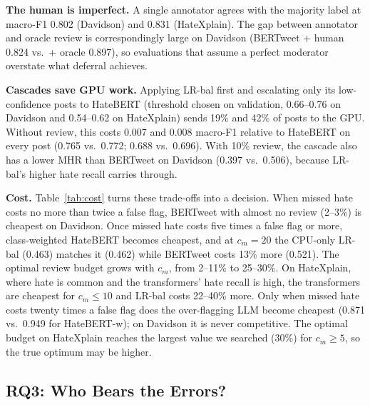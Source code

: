 \documentclass[lettersize,journal]{IEEEtran}
\begin{document}
\textbf{The human is imperfect.} A single annotator agrees with the majority label at macro-F1 0.802 (Davidson) and 0.831 (HateXplain). The gap between annotator and oracle review is correspondingly large on Davidson (BERTweet + human 0.824 vs.\ + oracle 0.897), so evaluations that assume a perfect moderator overstate what deferral achieves.

\textbf{Cascades save GPU work.} Applying LR-bal first and escalating only its low-confidence posts to HateBERT (threshold chosen on validation, 0.66--0.76 on Davidson and 0.54--0.62 on HateXplain) sends 19\% and 42\% of posts to the GPU. Without review, this costs 0.007 and 0.008 macro-F1 relative to HateBERT on every post (0.765 vs.\ 0.772; 0.688 vs.\ 0.696). With 10\% review, the cascade also has a lower MHR than BERTweet on Davidson (0.397 vs.\ 0.506), because LR-bal's higher hate recall carries through.

\begin{table}[t]
\centering
\caption{Cost-Minimizing Review Budget $b^{*}$ and Expected Cost per Post $J(b^{*})$ as the Cost of Missed Hate $c_m$ Grows (Mean Over Splits; Budgets Searched Up to 30\%). Bold: Lowest Cost.}
\label{tab:cost}
\scriptsize
\setlength{\tabcolsep}{4pt}

\end{table}

\textbf{Cost.} Table~\ref{tab:cost} turns these trade-offs into a decision. When missed hate costs no more than twice a false flag, BERTweet with almost no review (2--3\%) is cheapest on Davidson. Once missed hate costs five times a false flag or more, class-weighted HateBERT becomes cheapest, and at $c_m=20$ the CPU-only LR-bal (0.463) matches it (0.462) while BERTweet costs 13\% more (0.521). The optimal review budget grows with $c_m$, from 2--11\% to 25--30\%. On HateXplain, where hate is common and the transformers' hate recall is high, the transformers are cheapest for $c_m\le10$ and LR-bal costs 22--40\% more. Only when missed hate costs twenty times a false flag does the over-flagging LLM become cheapest (0.871 vs.\ 0.949 for HateBERT-w); on Davidson it is never competitive. The optimal budget on HateXplain reaches the largest value we searched (30\%) for $c_m\ge5$, so the true optimum may be higher.

\subsection{RQ3: Who Bears the Errors?}\label{sec:rq3}
\begin{table}[t]
\centering
\caption{Dialect Disparity on Davidson (Posterior Threshold 0.5; Mean Over Splits). FHF = False Hate-Flag Rate Among Non-Hate Tweets; FAF = False Abusive-Flag Rate (Hate or Offensive) Among Tweets Labeled Neither; Deferred = Share of the Group's Tweets Sent to Review. AAE/WAE = Ratio of Group Means.}
\label{tab:dialect}
\scriptsize
\setlength{\tabcolsep}{3.5pt}

\end{table}
\end{document}
